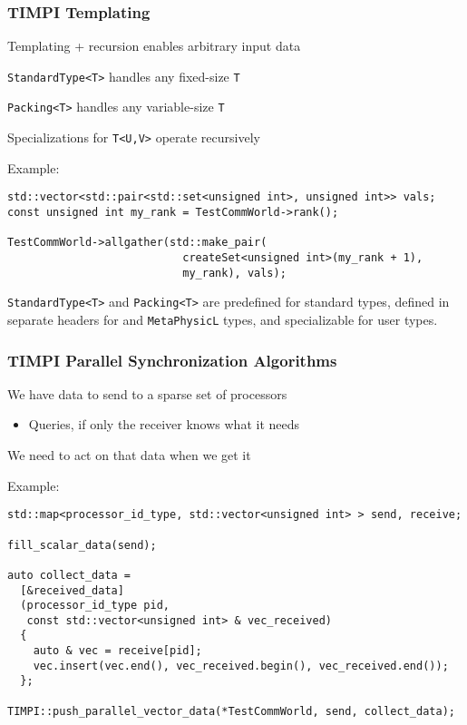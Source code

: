 \begin{frame}[fragile]
\frametitle{TIMPI Templating}
\item Templating + recursion enables arbitrary input data
\item \texttt{StandardType<T>} handles any fixed-size \texttt{T}
\item \texttt{Packing<T>} handles any variable-size \texttt{T}
\item Specializations for \texttt{T<U,V>} operate recursively
\royitemizeend

\pause

Example:
\small
\begin{lstlisting}
std::vector<std::pair<std::set<unsigned int>, unsigned int>> vals;
const unsigned int my_rank = TestCommWorld->rank();

TestCommWorld->allgather(std::make_pair(
                           createSet<unsigned int>(my_rank + 1),
                           my_rank), vals);
\end{lstlisting}

\pause

\texttt{StandardType<T>} and \texttt{Packing<T>} are predefined for
  standard types, defined in separate headers for \libMesh{} and
  \texttt{MetaPhysicL} types, and specializable for user types.


\end{frame}



\begin{frame}[fragile]
\frametitle{TIMPI Parallel Synchronization Algorithms}
\item We have data to send to a sparse set of processors
  \begin{itemize}
    \item Queries, if only the receiver knows what it needs
  \end{itemize}
\item We need to act on that data when we get it
\royitemizeend

\pause

Example:
\small
\begin{lstlisting}
std::map<processor_id_type, std::vector<unsigned int> > send, receive;

fill_scalar_data(send);

auto collect_data =
  [&received_data]
  (processor_id_type pid,
   const std::vector<unsigned int> & vec_received)
  {
    auto & vec = receive[pid];
    vec.insert(vec.end(), vec_received.begin(), vec_received.end());
  };

TIMPI::push_parallel_vector_data(*TestCommWorld, send, collect_data);
\end{lstlisting}

\end{frame}

